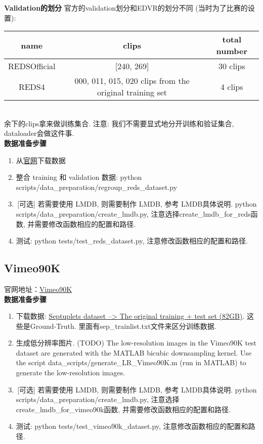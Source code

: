 \documentclass[../main.tex]{subfiles}
\begin{document}
\noindent\textbf{Validation的划分}
官方的validation划分和EDVR的划分不同 (当时为了比赛的设置):\\
\begin{table}[htbp]
    \centering
    {
        \begin{tabular}{|c|c|c|}
            \hline
            \textbf{name} & \textbf{clips} & \textbf{total number}                               \\ \hline
            REDSOfficial              & [240, 269]      & 30 clips                               \\ \hline
            REDS4          & 000, 011, 015, 020 clips from the original training set      & 4 clips       \\ \hline
        \end{tabular}
    }
\end{table}\\
余下的clips拿来做训练集合. 注意: 我们不需要显式地分开训练和验证集合, dataloader会做这件事.\\

\noindent\textbf{数据准备步骤}

\begin{enumerate}
\item 从\href{https://seungjunnah.github.io/Datasets/reds.html}{官网}下载数据
\item 整合 training 和 validation 数据: python scripts/data\_preparation/regroup\_reds\_dataset.py
\item\,[可选] 若需要使用 LMDB, 则需要制作 LMDB, 参考 LMDB具体说明. python scripts/data\_preparation/create\_lmdb.py, 注意选择create\_lmdb\_for\_reds函数, 并需要修改函数相应的配置和路径.
\item 测试: python tests/test\_reds\_dataset.py, 注意修改函数相应的配置和路径.
\end{enumerate}

\subsection{Vimeo90K}
官网地址：\href{http://toflow.csail.mit.edu/}{Vimeo90K}\\

\noindent\textbf{数据准备步骤}
\begin{enumerate}
\item 下载数据: \href{http://data.csail.mit.edu/tofu/dataset/vimeo_septuplet.zip}{Septuplets dataset --> The original training + test set (82GB)}. 这些是Ground-Truth. 里面有sep\_trainlist.txt文件来区分训练数据.
\item 生成低分辨率图片. (TODO) The low-resolution images in the Vimeo90K test dataset are generated with the MATLAB bicubic downsampling kernel. Use the script data\_scripts/generate\_LR\_Vimeo90K.m (run in MATLAB) to generate the low-resolution images.
\item\,[可选] 若需要使用 LMDB, 则需要制作 LMDB, 参考 LMDB具体说明. python scripts/data\_preparation/create\_lmdb.py, 注意选择create\_lmdb\_for\_vimeo90k函数, 并需要修改函数相应的配置和路径.
\item 测试: python tests/test\_vimeo90k\_dataset.py, 注意修改函数相应的配置和路径.
\end{enumerate}
\end{document}
